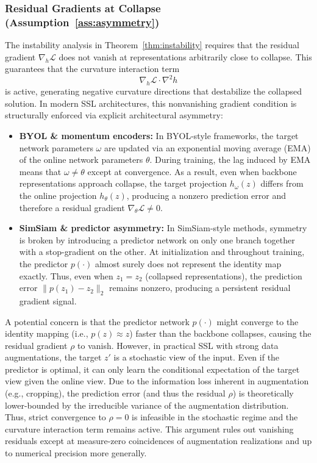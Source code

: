 \documentclass{article}
\theoremstyle{plain}
\theoremstyle{definition}
\theoremstyle{remark}
\begin{document}
\subsubsection{Residual Gradients at Collapse (Assumption~\ref{ass:asymmetry})}

The instability analysis in Theorem~\ref{thm:instability} requires that the residual gradient $\nabla_h \mathcal L$ does not vanish at representations arbitrarily close to collapse. This guarantees that the curvature interaction term
\begin{equation*}
    \nabla_h \mathcal L \cdot \nabla^2 h
\end{equation*}
is active, generating negative curvature directions that destabilize the collapsed solution. In modern SSL architectures, this nonvanishing gradient condition is structurally enforced via explicit architectural asymmetry:

\begin{itemize}
    \item \textbf{BYOL \& momentum encoders:}
    In BYOL-style frameworks, the target network parameters $\omega$ are updated via an exponential moving average (EMA) of the online network parameters $\theta$. During training, the lag induced by EMA means that $\omega \neq \theta$ except at convergence. As a result, even when backbone representations approach collapse, the target projection $h_\omega(z)$ differs from the online projection $h_\theta(z)$, producing a nonzero prediction error and therefore a residual gradient $\nabla_\theta \mathcal L \neq 0$.

    \item \textbf{SimSiam \& predictor asymmetry:}
    In SimSiam-style methods, symmetry is broken by introducing a predictor network on only one branch together with a stop-gradient on the other. At initialization and throughout training, the predictor $p(\cdot)$ almost surely does not represent the identity map exactly. Thus, even when $z_1 = z_2$ (collapsed representations), the prediction error $\|p(z_1) - z_2\|_2$ remains nonzero, producing a persistent residual gradient signal.
\end{itemize}

A potential concern is that the predictor network $p(\cdot)$ might converge to the identity mapping (i.e., $p(z) \approx z$) faster than the backbone collapses, causing the residual gradient $\rho$ to vanish.
However, in practical SSL with strong data augmentations, the target $z'$ is a stochastic view of the input. Even if the predictor is optimal, it can only learn the conditional expectation of the target view given the online view. Due to the information loss inherent in augmentation (e.g., cropping), the prediction error (and thus the residual $\rho$) is theoretically lower-bounded by the irreducible variance of the augmentation distribution. Thus, strict convergence to $\rho=0$ is infeasible in the stochastic regime and the curvature interaction term remains active. This argument rules out vanishing residuals except at measure-zero coincidences of augmentation realizations and up to numerical precision more generally.
\end{document}
